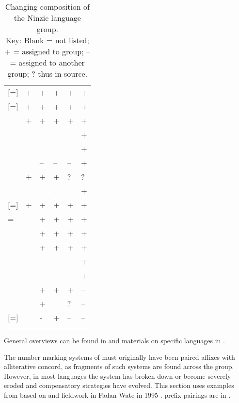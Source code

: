\documentclass[output=paper]{langsci/langscibook}
\begin{document}
\begin{table}
\caption{\label{tab:nomaffplat:12}Changing composition of the Ninzic language group.\\
Key: Blank = not listed; + = assigned to group; -- = assigned to another group; ? thus in source.}
\begin{tabularx}{\textwidth}{l QQQQQ@{\qquad}}
\lsptoprule
	&
 	& 
 	&
 	&
 	& 
\\
\midrule
{} [=]   	& + 	& + 	& + 	& + 	& +\\
   [=] 	& + 	& + 	& + 	& + 	& +\\
 	& + 	& + 	& + 	& + 	& +\\
 	&  	&  	&  	&  	& +\\
 	&  	&  	&  	&  	& +\\
 	&  	& – 	& – 	& – 	& +\\
 	& + 	& + 	& + 	& ? 	& ?\\
 	&  	& - 	& - 	& - 	& +\\
 [=] 	& + 	& + 	& + 	& + 	& +\\
 =  	&  	& + 	& + 	& + 	& +\\
 	&  	& + 	& + 	& + 	& +\\
 	&  	& + 	& + 	& + 	& +\\
 	&  	&  	&  	&  	& +\\
 	&  	&  	&  	&  	& +\\
 	&  	& + 	& + 	& + 	& –\\
 	&  	& + 	&  	& ? 	& –\\
[=] 	&  	& - 	& + 	& – 	& –\\
\lspbottomrule
\end{tabularx}
\end{table}

General overviews can be found in \citet{Gerhardt19723a,Gerhardt1983a} and materials on specific languages in \citet{Hoffman1976,Hörner1980,Price1989,Wilson2003}.

The number marking systems of  must originally have been paired affixes with alliterative concord, as fragments of such systems are found across the group. However, in most languages the system has broken down or become severely eroded and compensatory strategies have evolved. This section uses examples from  based on \citet{Hörner1980,NinzoLanguageProjectCommittee1999} and fieldwork in Fadan Wate in 1995 \citet{Blenchn.d.e}.  prefix pairings are in .
\end{document}
